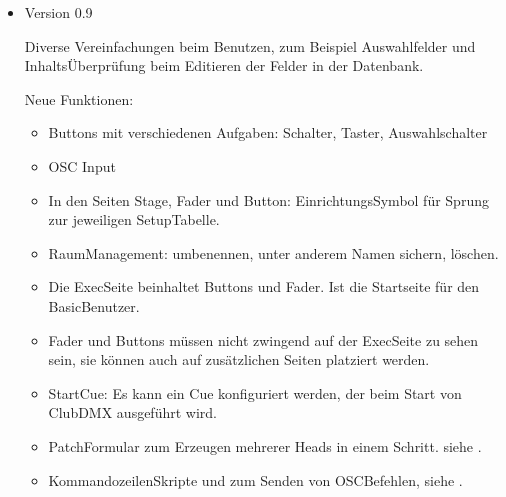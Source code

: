 \documentclass[letterpaper,10pt,ngerman]{sphinxmanual}
\begin{document}
\begin{itemize}
\begin{itemize}
\item {} 
Das Speichern des Topcue wird vereinfacht. Nun kann der Topcue
als Fader oder Button abgespeichert werden.

\item {} 
Die Raum\sphinxhyphen{}Sicherung wird erweitert um upload/download.

\end{itemize}

\item {} 
Version 0.9

Diverse Vereinfachungen beim Benutzen, zum Beispiel Auswahlfelder und
Inhalts\sphinxhyphen{}Überprüfung beim Editieren der Felder in der
Datenbank.

Neue Funktionen:
\begin{itemize}
\item {} 
Buttons mit verschiedenen Aufgaben: Schalter, Taster, Auswahlschalter

\item {} 
OSC Input

\item {} 
In den Seiten Stage, Fader und Button: Einrichtungs\sphinxhyphen{}Symbol für
Sprung zur jeweiligen Setup\sphinxhyphen{}Tabelle.

\item {} 
Raum\sphinxhyphen{}Management: umbenennen, unter anderem Namen sichern, löschen.

\item {} 
Die Exec\sphinxhyphen{}Seite beinhaltet Buttons und Fader. Ist die Startseite für den
Basic\sphinxhyphen{}Benutzer.

\item {} 
Fader und Buttons müssen nicht zwingend auf der Exec\sphinxhyphen{}Seite zu sehen sein,
sie können auch auf zusätzlichen Seiten platziert werden.

\item {} 
Start\sphinxhyphen{}Cue: Es kann ein Cue konfiguriert werden, der beim Start von
ClubDMX ausgeführt wird.

\item {} 
Patch\sphinxhyphen{}Formular zum Erzeugen mehrerer Heads in einem Schritt.
siehe {\hyperref[\detokenize{patch:neupatchlabel}]{}} .

\item {} 
Kommandozeilen\sphinxhyphen{}Skripte  und  zum Senden von
OSC\sphinxhyphen{}Befehlen, siehe {\hyperref[\detokenize{einrichten:crontab-label}]{}}.

\end{itemize}

\end{itemize}
\end{document}
